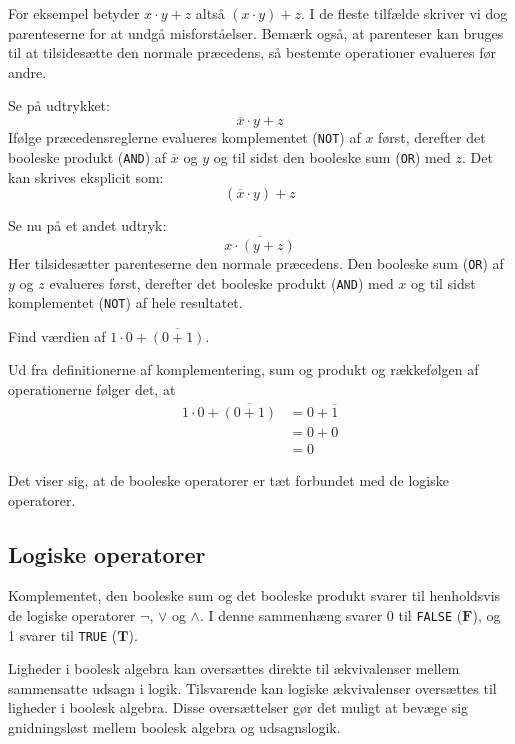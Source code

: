 For eksempel betyder $x \cdot y+z$ altså $(x \cdot y)+z$. I de fleste tilfælde skriver vi dog parenteserne for at undgå misforståelser. Bemærk også, at parenteser kan bruges til at tilsidesætte den normale præcedens, så bestemte operationer evalueres før andre.

Se på udtrykket:
\[
\overline{x} \cdot y + z
\]
Ifølge præcedensreglerne evalueres komplementet (\texttt{NOT}) af $x$ først, derefter det booleske produkt (\texttt{AND}) af $\overline{x}$ og $y$ og til sidst den booleske sum (\texttt{OR}) med $z$. Det kan skrives eksplicit som:
\[
(\overline{x} \cdot y) + z
\]

Se nu på et andet udtryk:
\[
\overline{x \cdot (y + z)}
\]
Her tilsidesætter parenteserne den normale præcedens. Den booleske sum (\texttt{OR}) af $y$ og $z$ evalueres først, derefter det booleske produkt (\texttt{AND}) med $x$ og til sidst komplementet (\texttt{NOT}) af hele resultatet.

\begin{example}
    Find værdien af $1 \cdot 0+\overline{(0+1)}$.

    \begin{solution}
        Ud fra definitionerne af komplementering, sum og produkt og rækkefølgen af operationerne følger det, at
        \[
        \begin{aligned}
        1 \cdot 0+\overline{(0+1)} & =0+\overline{1} \\
        & =0+0 \\
        & =0
        \end{aligned}
        \]
    \end{solution}
    \label{ex4.1}
\end{example}

Det viser sig, at de booleske operatorer er tæt forbundet med de logiske operatorer.

\subsection*{Logiske operatorer}
Komplementet, den booleske sum og det booleske produkt svarer til henholdsvis de logiske operatorer $\neg$, $\vee$ og $\wedge$. I denne sammenhæng svarer 0 til \texttt{FALSE} ($\mathbf{F}$), og 1 svarer til \texttt{TRUE} ($\mathbf{T}$). 

Ligheder i boolesk algebra kan oversættes direkte til ækvivalenser mellem sammensatte udsagn i logik. Tilsvarende kan logiske ækvivalenser oversættes til ligheder i boolesk algebra. Disse oversættelser gør det muligt at bevæge sig gnidningsløst mellem boolesk algebra og udsagnslogik.

